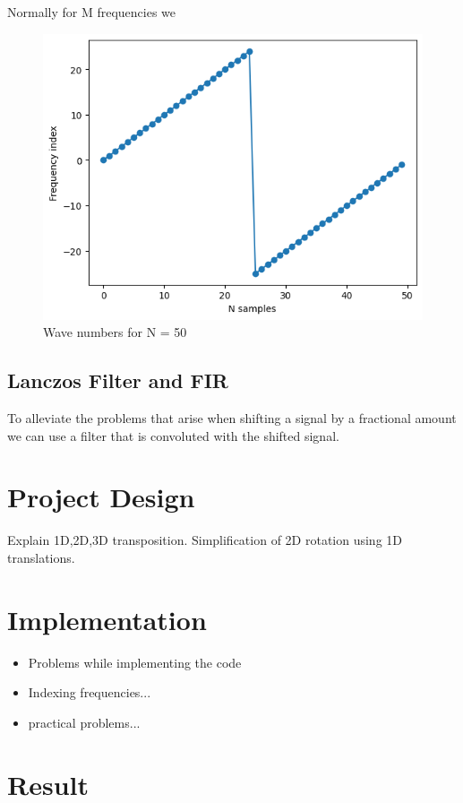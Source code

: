 \documentclass[]{usiinfbachelorproject}
\begin{document}
	Normally for M frequencies we 

	
	\begin{figure}[h]
		\centering
		\includegraphics[width=0.7\columnwidth]{images/wavenum_n50.png}
		\caption{Wave numbers for N = 50}
	\end{figure}
	
	
	\subsection{Lanczos Filter and FIR}
	To alleviate the problems that arise when shifting a signal by a fractional amount we can use a filter that is convoluted with the shifted signal.
	
	
	
	
	\section{Project Design}
	Explain 1D,2D,3D transposition.
	Simplification of 2D rotation using 1D translations.
	
	
	
	\section{Implementation}
	\begin{itemize}
		\item Problems while implementing the code
		\item Indexing frequencies...
		\item practical problems...
	\end{itemize}
	
	\section{Result}
	
\end{document}

